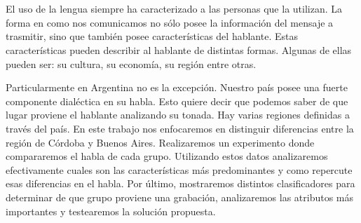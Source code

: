 \chapter*{\runtitulo}

\noindent 

El uso de la lengua siempre ha caracterizado a las personas que la utilizan. La forma en como nos comunicamos no sólo posee la información del mensaje a trasmitir, sino que también posee características del hablante. Estas características pueden describir al hablante de distintas formas. Algunas de ellas pueden ser: su cultura, su economía, su región entre otras. 

Particularmente en Argentina no es la excepción. Nuestro país posee una fuerte componente dialéctica en su habla. Esto quiere decir que podemos saber de que lugar proviene el hablante analizando su tonada. Hay varias regiones definidas a través del país. En este trabajo nos enfocaremos en distinguir diferencias entre la región de Córdoba y Buenos Aires. Realizaremos un experimento donde compararemos el habla de cada grupo. Utilizando estos datos analizaremos efectivamente cuales son las características más predominantes y como repercute esas diferencias en el habla. Por último, mostraremos distintos clasificadores para determinar de que grupo proviene una grabación, analizaremos las atributos más importantes y testearemos la solución propuesta. 

\bigskip
